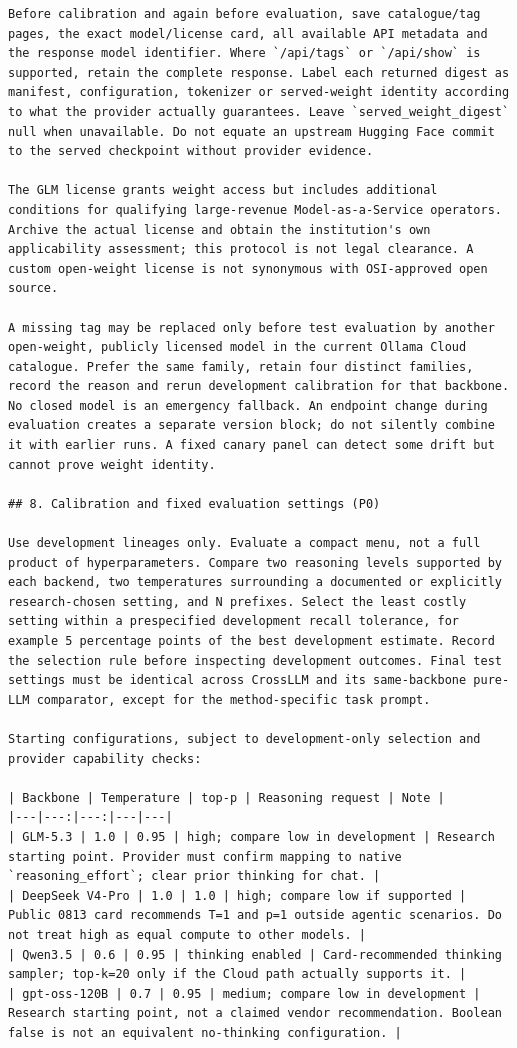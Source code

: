 \documentclass[11pt,a4paper]{article}
\begin{document}
\begin{verbatim}
Before calibration and again before evaluation, save catalogue/tag pages, the exact model/license card, all available API metadata and the response model identifier. Where `/api/tags` or `/api/show` is supported, retain the complete response. Label each returned digest as manifest, configuration, tokenizer or served-weight identity according to what the provider actually guarantees. Leave `served_weight_digest` null when unavailable. Do not equate an upstream Hugging Face commit to the served checkpoint without provider evidence.

The GLM license grants weight access but includes additional conditions for qualifying large-revenue Model-as-a-Service operators. Archive the actual license and obtain the institution's own applicability assessment; this protocol is not legal clearance. A custom open-weight license is not synonymous with OSI-approved open source.

A missing tag may be replaced only before test evaluation by another open-weight, publicly licensed model in the current Ollama Cloud catalogue. Prefer the same family, retain four distinct families, record the reason and rerun development calibration for that backbone. No closed model is an emergency fallback. An endpoint change during evaluation creates a separate version block; do not silently combine it with earlier runs. A fixed canary panel can detect some drift but cannot prove weight identity.

## 8. Calibration and fixed evaluation settings (P0)

Use development lineages only. Evaluate a compact menu, not a full product of hyperparameters. Compare two reasoning levels supported by each backend, two temperatures surrounding a documented or explicitly research-chosen setting, and N prefixes. Select the least costly setting within a prespecified development recall tolerance, for example 5 percentage points of the best development estimate. Record the selection rule before inspecting development outcomes. Final test settings must be identical across CrossLLM and its same-backbone pure-LLM comparator, except for the method-specific task prompt.

Starting configurations, subject to development-only selection and provider capability checks:

| Backbone | Temperature | top-p | Reasoning request | Note |
|---|---:|---:|---|---|
| GLM-5.3 | 1.0 | 0.95 | high; compare low in development | Research starting point. Provider must confirm mapping to native `reasoning_effort`; clear prior thinking for chat. |
| DeepSeek V4-Pro | 1.0 | 1.0 | high; compare low if supported | Public 0813 card recommends T=1 and p=1 outside agentic scenarios. Do not treat high as equal compute to other models. |
| Qwen3.5 | 0.6 | 0.95 | thinking enabled | Card-recommended thinking sampler; top-k=20 only if the Cloud path actually supports it. |
| gpt-oss-120B | 0.7 | 0.95 | medium; compare low in development | Research starting point, not a claimed vendor recommendation. Boolean false is not an equivalent no-thinking configuration. |


\end{verbatim}
\end{document}
